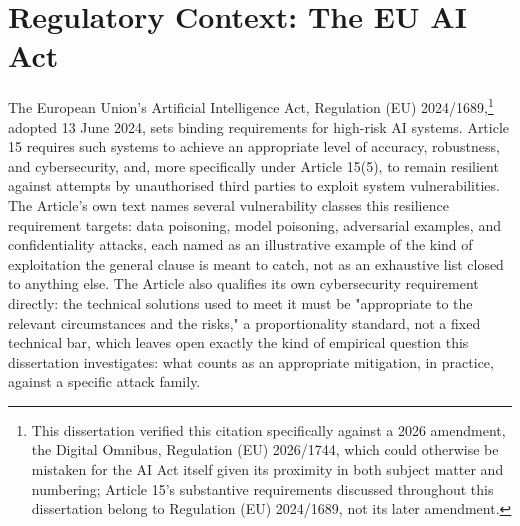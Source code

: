 \section{Regulatory Context: The EU AI Act}

The European Union's Artificial Intelligence Act, Regulation (EU)
2024/1689,\footnote{This dissertation verified this citation
specifically against a 2026 amendment, the Digital Omnibus, Regulation
(EU) 2026/1744, which could otherwise be mistaken for the AI Act itself
given its proximity in both subject matter and numbering; Article 15's
substantive requirements discussed throughout this dissertation belong
to Regulation (EU) 2024/1689, not its later amendment.} adopted 13 June
2024, sets binding requirements for high-risk AI systems. Article 15
requires such systems to achieve an appropriate level of accuracy,
robustness, and cybersecurity, and, more specifically under Article
15(5), to remain resilient against attempts by unauthorised third
parties to exploit system vulnerabilities. The Article's own text names
several vulnerability classes this resilience requirement targets: data
poisoning, model poisoning, adversarial examples, and confidentiality
attacks, each named as an illustrative example of the kind of
exploitation the general clause is meant to catch, not as an exhaustive
list closed to anything else. The Article also qualifies its own
cybersecurity requirement directly: the technical solutions used to meet
it must be "appropriate to the relevant circumstances and the risks," a
proportionality standard, not a fixed technical bar, which leaves open
exactly the kind of empirical question this dissertation investigates:
what counts as an appropriate mitigation, in practice, against a
specific attack family.

